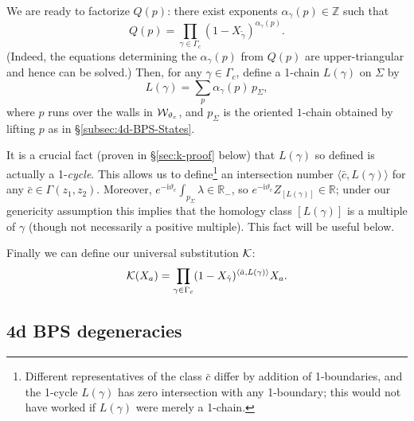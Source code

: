 \documentclass[11pt,a4paper]{article}
\def\R{{\mathbb{R}}}
\def\Z{{\mathbb{Z}}}
\def\wnet {{\cal W}}
\def\cK{{\cal K}}
\newcommand{\ti}[1]{\textit{#1}}
\def\wnet {{\cal W}}
\newcommand\I{{\mathrm i}}
\newcommand{\inprod}[1]{\langle#1\rangle}
\begin{document}
We are ready to factorize $Q(p)$:
there exist exponents $\alpha_{\gamma}(p)\in\Z$ such that
\begin{equation} \label{eq:Q-exp}
Q(p) = \prod_{\gamma \in \Gamma_c} (1 - X_{\tilde \gamma})^{\alpha_\gamma(p)}.
\end{equation}
(Indeed, the equations determining the $\alpha_\gamma(p)$ from $Q(p)$ are
upper-triangular and hence can be solved.)
Then, for any $\gamma \in \Gamma_c$, define a 1-chain $L(\gamma)$ on $\Sigma$ by
\begin{equation} \label{eq:def-L}
L(\gamma) = \sum_p \alpha_\gamma(p)\,p_\Sigma,
\end{equation}
where $p$ runs over the walls in $\wnet_{\vartheta_c}$,
and $p_\Sigma$ is the oriented $1$-chain obtained by lifting $p$
as in \S\ref{subsec:4d-BPS-States}.

It is a crucial fact (proven in \S\ref{sec:k-proof}
below) that $L(\gamma)$ so defined is actually a 1-\ti{cycle}.
This allows us to define\footnote{Different representatives
of the class $\bar c$ differ by addition of 1-boundaries, and the 1-cycle $L(\gamma)$ has zero
intersection with any 1-boundary; this would not have worked if $L(\gamma)$ were merely
a 1-chain.}
an intersection number $\inprod{\bar c, L(\gamma)}$ for any $\bar c \in \Gamma(z_1, z_2)$.
Moreover, $e^{-\I \vartheta_c} \int_{p_\Sigma} \lambda \in \R_-$,
so $e^{-\I \vartheta_c} Z_{[L(\gamma)]} \in \R$;
under our genericity assumption this implies that the homology class
$[L(\gamma)]$ is a multiple of $\gamma$ (though not necessarily a positive multiple).
This fact will be useful below.

Finally we can define our universal substitution $\cK$:
\begin{equation} \label{eq:k-def}
 \cK(X_a) = \prod_{\gamma \in \Gamma_c} (1 - X_{\tilde\gamma})^{\inprod{\bar a,L(\gamma)}} X_a.
\end{equation}


\subsection{4d BPS degeneracies}\label{subsec:4d-degen}
\end{document}
